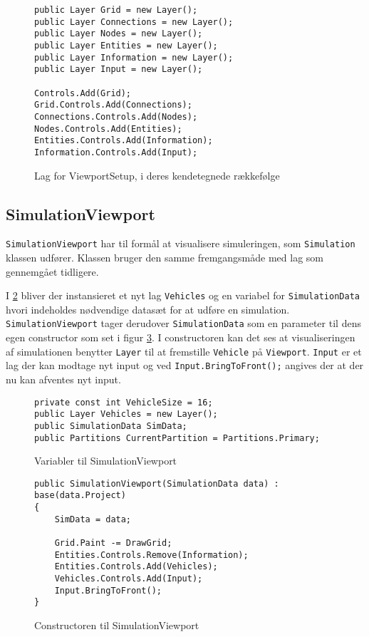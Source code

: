 \begin{figure}[H]
\begin{lstlisting}
public Layer Grid = new Layer();
public Layer Connections = new Layer();
public Layer Nodes = new Layer();
public Layer Entities = new Layer();
public Layer Information = new Layer();
public Layer Input = new Layer();

Controls.Add(Grid);
Grid.Controls.Add(Connections);
Connections.Controls.Add(Nodes);
Nodes.Controls.Add(Entities);
Entities.Controls.Add(Information);
Information.Controls.Add(Input);
\end{lstlisting}
\caption{Lag for ViewportSetup, i deres kendetegnede rækkefølge}
\label{ViewportSetupLayers}
\end{figure}

\subsection{SimulationViewport}\label{SimulationViewport}

\texttt{SimulationViewport} har til formål at visualisere simuleringen, som \texttt{Simulation} klassen udfører. Klassen bruger den samme fremgangsmåde med lag som gennemgået tidligere.

\vspace{5mm}

I \ref{ViewPortSimulation} bliver der instansieret et nyt lag \texttt{Vehicles} og en variabel for \texttt{SimulationData} hvori indeholdes nødvendige datasæt for at udføre en simulation. \texttt{SimulationViewport} tager derudover \texttt{SimulationData} som en parameter til dens egen constructor som set i figur \ref{ViewportSimulationConstructor}. I constructoren kan det ses at visualiseringen af simulationen benytter \texttt{Layer} til at fremstille \texttt{Vehicle} på \texttt{Viewport}. \texttt{Input} er et lag der kan modtage nyt input og ved \texttt{Input.BringToFront();} angives der at der nu kan afventes nyt input.

\begin{figure}[H]
\begin{lstlisting}
private const int VehicleSize = 16;
public Layer Vehicles = new Layer();
public SimulationData SimData;
public Partitions CurrentPartition = Partitions.Primary;
\end{lstlisting}
\caption{Variabler til SimulationViewport}
\label{ViewPortSimulation}
\end{figure}

\begin{figure}[H]
\begin{lstlisting}
public SimulationViewport(SimulationData data) : base(data.Project)
{
    SimData = data;
            
    Grid.Paint -= DrawGrid;
    Entities.Controls.Remove(Information);
    Entities.Controls.Add(Vehicles);
    Vehicles.Controls.Add(Input);
    Input.BringToFront();
}
\end{lstlisting}
\caption{Constructoren til SimulationViewport}
\label{ViewportSimulationConstructor}
\end{figure}

